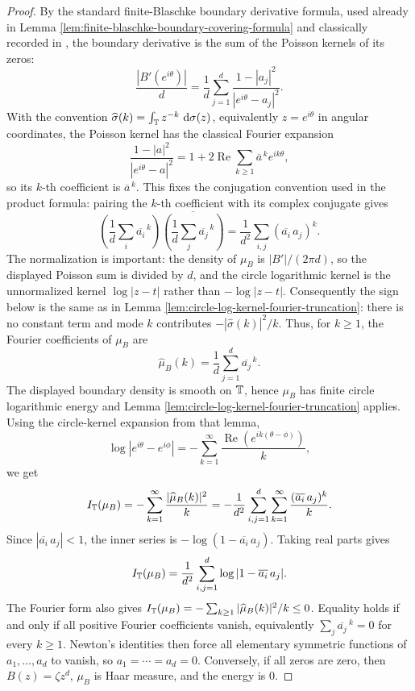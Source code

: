 \begin{proof}
By the standard finite-Blaschke boundary derivative formula, used already in Lemma \ref{lem:finite-blaschke-boundary-covering-formula} and classically recorded in \citet[Sec.~1.2]{Duren1970}, the boundary derivative is the sum of the Poisson kernels of its zeros:
\[
\frac{|B'(e^{i\theta})|}{d}
=\frac1d\sum_{j=1}^{d}\frac{1-|a_j|^2}{|e^{i\theta}-a_j|^2}.
\]
With the convention \(\widehat\sigma(k)=\int_{\mathbb{T}} z^{-k}\,\,\mathrm{d}\sigma(z)\), equivalently \(z=e^{i\theta}\) in angular coordinates, the Poisson kernel has the classical Fourier expansion \citep[Sec.~1.2]{Duren1970}
\[
\frac{1-|a|^2}{|e^{i\theta}-a|^2}=
1+2\operatorname{Re}\sum_{k\ge1}\overline a^{\,k}e^{ik\theta},
\]
so its \(k\)-th coefficient is \(\overline a^{\,k}\).  This fixes the conjugation convention used in the product formula: pairing the \(k\)-th coefficient with its complex conjugate gives
\[
\left(\frac1d\sum_i\overline{a_i}^{\,k}\right)
\overline{\left(\frac1d\sum_j\overline{a_j}^{\,k}\right)}
=\frac1{d^2}\sum_{i,j}(\overline{a_i}\,a_j)^k.
\]
The normalization is important: the density of \(\mu_B\) is \(|B'|/(2\pi d)\), so the displayed Poisson sum is divided by \(d\), and the circle logarithmic kernel is the unnormalized kernel \(\log|z-t|\) rather than \(-\log|z-t|\).  Consequently the sign below is the same as in Lemma \ref{lem:circle-log-kernel-fourier-truncation}: there is no constant term and mode \(k\) contributes \(-|\widehat\sigma(k)|^2/k\).
Thus, for \(k\ge1\), the Fourier coefficients of \(\mu_B\) are
\[
\widehat\mu_B(k)=\frac1d\sum_{j=1}^{d}\overline{a_j}^{\,k}.
\]
The displayed boundary density is smooth on \(\mathbb{T}\), hence \(\mu_B\) has finite circle logarithmic energy and Lemma \ref{lem:circle-log-kernel-fourier-truncation} applies.  Using the circle-kernel expansion from that lemma,
\[
\log|e^{i\theta}-e^{i\phi}|
=-\sum_{k=1}^{\infty}\frac{\operatorname{Re}(e^{ik(\theta-\phi)})}{k},
\]
we get
\[
I_{\mathbb{T}}(\mu_B)=-\sum_{k=1}^{\infty}\frac{|\widehat\mu_B(k)|^2}{k}
=-\frac1{d^2}\sum_{i,j=1}^{d}\sum_{k=1}^{\infty}\frac{(\overline{a_i}\,a_j)^k}{k}.
\]
Since \(|\overline{a_i}\,a_j|<1\), the inner series is \(-\log(1-\overline{a_i}\,a_j)\).  Taking real parts gives
\[
I_{\mathbb{T}}(\mu_B)=\frac1{d^2}\sum_{i,j=1}^{d}\log|1-\overline{a_i}\,a_j|.
\]
The Fourier form also gives \(I_{\mathbb{T}}(\mu_B)=-\sum_{k\ge1}|\widehat\mu_B(k)|^2/k\le0\).  Equality holds if and only if all positive Fourier coefficients vanish, equivalently \(\sum_j\overline{a_j}^{\ k}=0\) for every \(k\ge1\).  Newton's identities then force all elementary symmetric functions of \(a_1,\dots,a_d\) to vanish, so \(a_1=\cdots=a_d=0\).  Conversely, if all zeros are zero, then \(B(z)=\zeta z^d\), \(\mu_B\) is Haar measure, and the energy is \(0\).
\end{proof}

